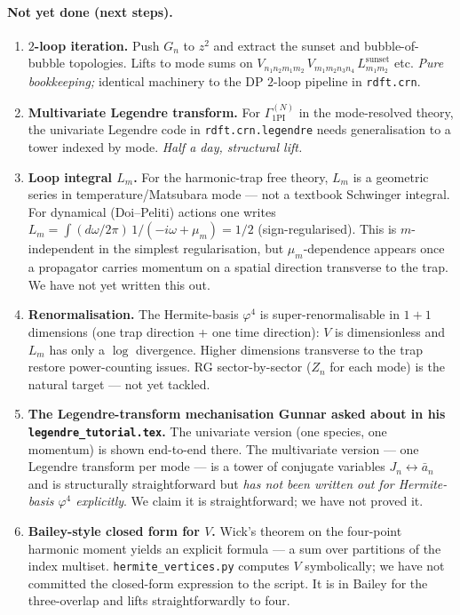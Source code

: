 \documentclass[11pt,a4paper]{article}
\begin{document}
\paragraph{Not yet done (next steps).}
\begin{enumerate}[leftmargin=2em,itemsep=2pt,topsep=2pt]
\item \textbf{$2$-loop iteration.} Push $G_{n}$ to $z^{2}$ and extract the sunset and
bubble-of-bubble topologies. Lifts to mode sums on $V_{n_{1}n_{2}m_{1}m_{2}}\,
V_{m_{1}m_{2}n_{3}n_{4}}\,L_{m_{1}m_{2}}^{\text{sunset}}$ etc. \emph{Pure bookkeeping;}
identical machinery to the DP $2$-loop pipeline in \texttt{rdft.crn}.
\item \textbf{Multivariate Legendre transform.} For $\Gamma_{\text{1PI}}^{(N)}$ in the
mode-resolved theory, the univariate Legendre code in \texttt{rdft.crn.legendre} needs
generalisation to a tower indexed by mode. \emph{Half a day, structural lift.}
\item \textbf{Loop integral $L_{m}$.} For the harmonic-trap free theory, $L_{m}$ is a
geometric series in temperature/Matsubara mode --- not a textbook Schwinger integral.
For dynamical (Doi--Peliti) actions one writes $L_{m} = \int (d\omega/2\pi)\,
1/(-i\omega + \mu_{m}) = 1/2$ (sign-regularised). This is $m$-independent in the simplest
regularisation, but $\mu_{m}$-dependence appears once a propagator carries momentum on a
spatial direction transverse to the trap. We have not yet written this out.
\item \textbf{Renormalisation.} The Hermite-basis $\varphi^{4}$ is super-renormalisable in
$1+1$ dimensions (one trap direction + one time direction): $V$ is dimensionless and
$L_{m}$ has only a $\log$ divergence. Higher dimensions transverse to the trap restore
power-counting issues. RG sector-by-sector ($Z_{n}$ for each mode) is the natural target
--- not yet tackled.
\item \textbf{The Legendre-transform mechanisation Gunnar asked about in his
\texttt{legendre\_tutorial.tex}.} The univariate version (one species, one momentum) is
shown end-to-end there. The multivariate version --- one Legendre transform per mode ---
is a tower of conjugate variables $J_{n}\leftrightarrow\bar a_{n}$ and is structurally
straightforward but \emph{has not been written out for Hermite-basis $\varphi^{4}$
explicitly}. We claim it is straightforward; we have not proved it.
\item \textbf{Bailey-style closed form for $V$.} Wick's theorem on the four-point harmonic
moment yields an explicit formula --- a sum over partitions of the index multiset.
\texttt{hermite\_vertices.py} computes $V$ symbolically; we have not committed the
closed-form expression to the script. It is in Bailey \cite{Bailey} for the three-overlap
and lifts straightforwardly to four.
\end{enumerate}
\end{document}
